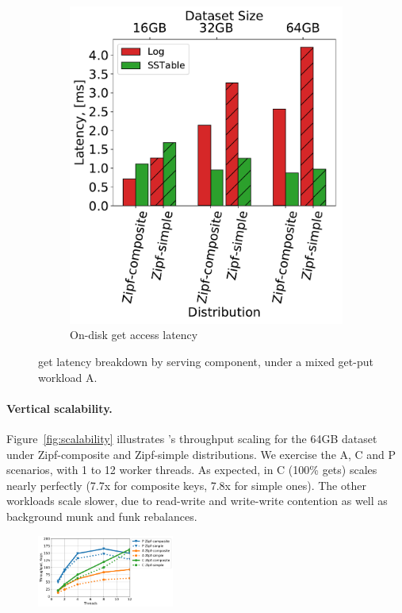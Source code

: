 {\begin{figure}[htb]
\begin{subfigure}{0.49\linewidth}
\includegraphics[width=\textwidth]{figs/Latency_A.pdf}
\caption{On-disk get access latency}
\label{fig:readstat:lat}
\end{subfigure}
\caption{{\sys\/ get latency breakdown by serving component, under a mixed get-put workload A.}}
\label{fig:readstat}
\end{figure}

\paragraph{Vertical scalability.} 
Figure~\ref{fig:scalability} illustrates \sys's throughput scaling for the 64GB dataset under Zipf-composite and Zipf-simple  
distributions. We exercise the A, C and P scenarios, with 1 to 12 worker threads.  
As expected, in C (100\% gets) \sys\/ scales nearly perfectly (7.7x for composite keys, 7.8x for simple ones). 
The other workloads scale slower, due to read-write and write-write contention as well as background munk and funk rebalances. 

\begin{figure}[th]
\centering
\includegraphics[width=0.4\textwidth]{figs/scalability_line.pdf}


\end{figure}}
